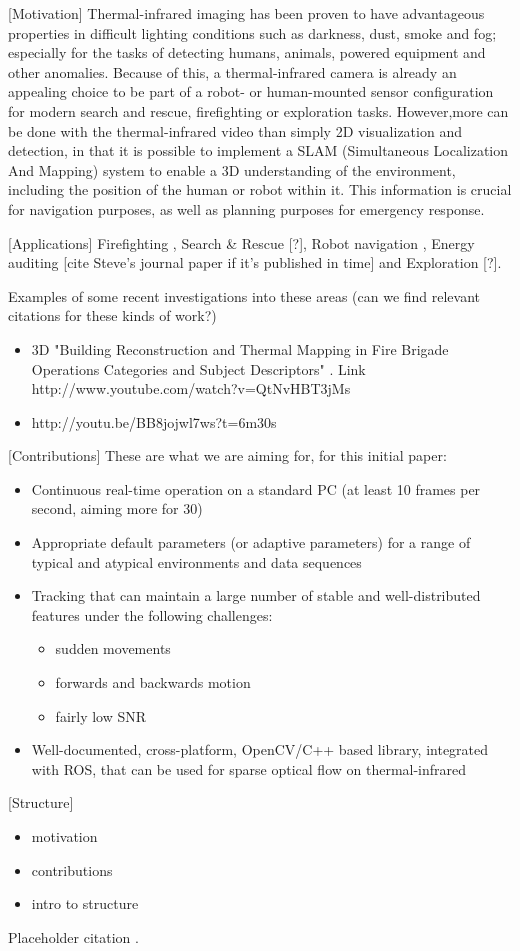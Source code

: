 [Motivation] 
Thermal-infrared imaging has been proven to have advantageous properties in difficult lighting conditions such as darkness, dust, smoke and fog; especially for the tasks of detecting humans, animals, powered equipment and other anomalies. Because of this, a thermal-infrared camera is already an appealing choice to be part of a robot- or human-mounted sensor configuration for modern search and rescue, firefighting or exploration tasks. However,more can be done with the thermal-infrared video than simply 2D visualization and detection, in that it is possible to implement a SLAM (Simultaneous Localization And Mapping) system to enable a 3D understanding of the environment, including the position of the human or robot within it. This information is crucial for navigation purposes, as well as planning purposes for emergency response.

[Applications]
Firefighting \cite{Schonauer}, Search \& Rescue [?], Robot navigation \cite{Maddern, Gonzalez2011}, Energy auditing [cite Steve's journal paper if it's published in time] and Exploration [?].

Examples of some recent investigations into these areas (can we find relevant citations for these kinds of work?)
\begin{itemize}
	\item 3D "Building Reconstruction and Thermal Mapping in Fire Brigade Operations Categories and Subject Descriptors" \cite{schonauer20133d}. Link 
	http://www.youtube.com/watch?v=QtNvHBT3jMs   	 
	\item http://youtu.be/BB8jojwl7ws?t=6m30s
\end{itemize}

[Contributions]
These are what we are aiming for, for this initial paper:
\begin{itemize}
	\item Continuous real-time operation on a standard PC (at least 10 frames per second, aiming more for 30)
	\item Appropriate default parameters (or adaptive parameters) for a range of typical and atypical environments and data sequences
	\item Tracking that can maintain a large number of stable and well-distributed features under the following challenges:
		\begin{itemize}
			\item sudden movements
			\item forwards and backwards motion
			\item fairly low SNR
		\end{itemize}
	\item Well-documented, cross-platform, OpenCV/C++ based library, integrated with ROS, that can be used for sparse optical flow on thermal-infrared
\end{itemize}

[Structure]

\begin{itemize}
	\item motivation
	\item contributions
	\item intro to structure
\end{itemize}

Placeholder citation \cite{Vidas2011}.